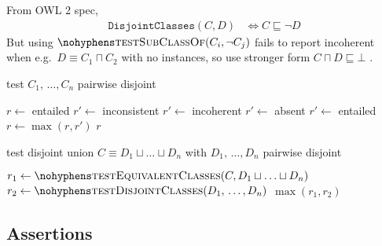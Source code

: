 \documentclass[paper.tex]{subfiles}
\begin{document}
From OWL 2 spec,
\begin{align*}
  \mathtt{DisjointClasses}(C, D)
  &\iff C \sqsubseteq \neg D
\end{align*}
But using $\textproc{testSubClassOf}(C_i, \neg C_j)$ fails to report incoherent when e.g.\ $D \equiv C_1 \sqcap C_2$ with no instances, so use stronger form $C \sqcap D \sqsubseteq \bot$ .

\begin{algorithm}[H]
  \caption{test $C_1, \,\ldots, C_n$ pairwise disjoint}
  \begin{algorithmic}[1]
    \raggedright
      \State $r \gets$ entailed
            \State $r' \gets$ inconsistent
            \State $r' \gets$ incoherent
            \State $r' \gets$ absent
          \Else
            \State $r' \gets$ entailed
          \EndIf
          \State $r \gets \max(r, r')$
        \EndFor
      \EndFor
      \State \Return $r$
    \EndFunction
  \end{algorithmic}
\end{algorithm}

\begin{algorithm}[H]
  \caption{test disjoint union $C \equiv D_1 \sqcup \ldots \sqcup D_n$ with $D_1, \,\ldots, D_n$ pairwise disjoint}
  \begin{algorithmic}[1]
    \raggedright
      \State $r_1 \gets \Call{testEquivalentClasses}{C, D_1 \sqcup \ldots \sqcup D_n}$
      \State $r_2 \gets \Call{testDisjointClasses}{D_1, \,\ldots, D_n}$
      \State \Return $\max(r_1, r_2)$
    \EndFunction
  \end{algorithmic}
\end{algorithm}


\subsection{Assertions}
\label{sec:algorithms:assert}
\end{document}
